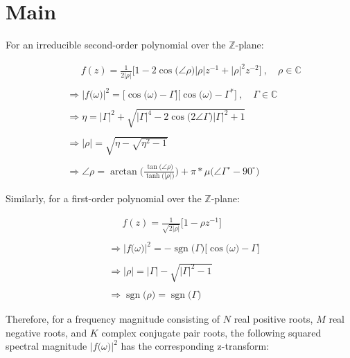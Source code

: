\documentclass{article}
\DeclareMathOperator{\sgn}{sgn}
\begin{document}
\section{Main}

For an irreducible second-order polynomial over the $\mathbb{Z}$-plane:

\begin{align*}
    & \quad \ \ f(z) = \frac{1}{2\big|\rho\big|}\bigg[1 - 2\cos\big(\angle{\rho}\big)\big|\rho\big|z^{-1} + \big|\rho\big|^{2}z^{-2} \bigg] \ , \quad \rho \in \mathbb{C} \\ \\
    & \Rightarrow \Big|f\big(\omega\big)\Big|^{2} = \Big[\cos\big(\omega\big) - \Gamma\Big]\Big[\cos\big(\omega\big) - \Gamma^{*}\Big] \ , \quad \Gamma \in \mathbb{C} \\ \\ 
    & \Rightarrow \eta = \big|\Gamma\big|^{2} + \sqrt{\big|\Gamma\big|^{4} - 2\cos\big(2\angle{\Gamma}\big)|\Gamma|^{2} + 1} \\ \\
    & \Rightarrow \big|\rho\Big| = \sqrt{\eta - \sqrt{\eta^{2} - 1}} \\ \\
    & \Rightarrow \angle{\rho} = \arctan\Bigg( \frac{\tan\big(\angle{\rho}\big)}{\tanh\big(\big|\rho\big|\big)} \Bigg) + \pi * \mu\Big(\angle{\Gamma}^{\circ} - 90^{\circ}\Big)
  \end{align*}\newline

Similarly, for a first-order polynomial over the $\mathbb{Z}$-plane:

\begin{align*}
    & \quad \ \ f(z) = \frac{1}{\sqrt{2\big|\rho\big|}}\big[1 - \rho z^{-1}\big] \\ \\
    & \Rightarrow \Big|f\big(\omega\big)\Big|^{2} = -\sgn\big(\Gamma\big)\bigg[\cos\big(\omega\big) - \Gamma\bigg] \\ \\ 
    & \Rightarrow \big|\rho\big| = \big|\Gamma\big| - \sqrt{\big|\Gamma\big|^{2} - 1} \\ \\
    & \Rightarrow \sgn\big(\rho\big) = \sgn\big(\Gamma\big)
  \end{align*}\newline

Therefore, for a frequency magnitude consisting of $N$ real positive roots, $M$ real negative roots, and $K$ complex conjugate pair roots, the following squared spectral magnitude $\Big|f\big(\omega\big)\Big|^{2}$ has the corresponding z-transform:
\end{document}
